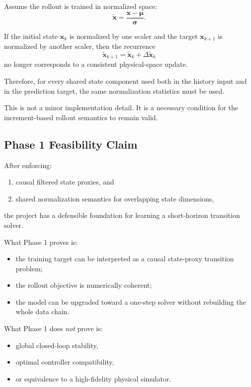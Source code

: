 Assume the rollout is trained in normalized space:
\[
\tilde{\mathbf{x}} = \frac{\mathbf{x} - \boldsymbol{\mu}}{\boldsymbol{\sigma}}.
\]

If the initial state $\mathbf{x}_k$ is normalized by one scaler
and the target $\mathbf{x}_{k+1}$ is normalized by another scaler,
then the recurrence
\[
\tilde{\mathbf{x}}_{k+1} = \tilde{\mathbf{x}}_k + \Delta \tilde{\mathbf{x}}_k
\]
no longer corresponds to a consistent physical-space update.

Therefore, for every shared state component used both in the history input and in the prediction target,
the same normalization statistics must be used.

This is not a minor implementation detail.
It is a necessary condition for the increment-based rollout semantics to remain valid.

\subsection{Phase 1 Feasibility Claim}

After enforcing:

\begin{enumerate}
\item causal filtered state proxies, and
\item shared normalization semantics for overlapping state dimensions,
\end{enumerate}

the project has a defensible foundation for learning a short-horizon transition solver.

What Phase 1 proves is:

\begin{itemize}
\item the training target can be interpreted as a causal state-proxy transition problem;
\item the rollout objective is numerically coherent;
\item the model can be upgraded toward a one-step solver without rebuilding the whole data chain.
\end{itemize}

What Phase 1 does \emph{not} prove is:

\begin{itemize}
\item global closed-loop stability,
\item optimal controller compatibility,
\item or equivalence to a high-fidelity physical simulator.
\end{itemize}

